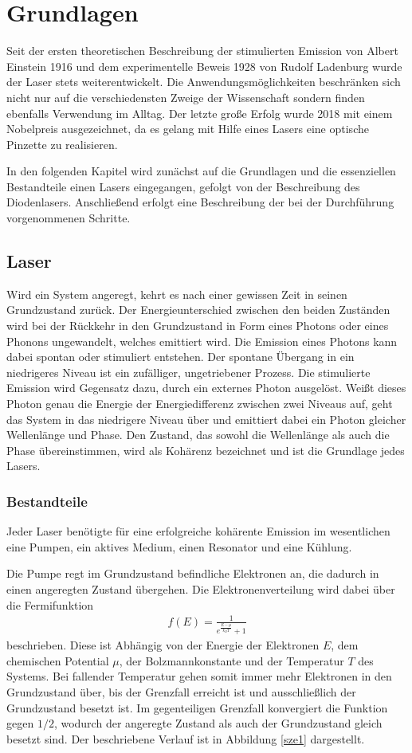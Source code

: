 \section{Grundlagen}
\label{sec:Grundlagen}
Seit der ersten theoretischen Beschreibung der stimulierten Emission von Albert Einstein 1916 und dem experimentelle Beweis 1928 von Rudolf Ladenburg wurde der Laser stets weiterentwickelt. Die Anwendungsmöglichkeiten beschränken sich nicht nur auf die verschiedensten Zweige der Wissenschaft sondern finden ebenfalls Verwendung im Alltag. Der letzte große Erfolg wurde 2018 mit einem Nobelpreis ausgezeichnet, da es gelang mit Hilfe eines Lasers eine optische Pinzette zu realisieren.

In den folgenden Kapitel wird zunächst auf die Grundlagen und die essenziellen Bestandteile einen Lasers eingegangen, gefolgt von der Beschreibung des Diodenlasers. Anschließend erfolgt eine Beschreibung der bei der Durchführung vorgenommenen Schritte.

\subsection{Laser}
Wird ein System angeregt, kehrt es nach einer gewissen Zeit in seinen Grundzustand zurück. Der Energieunterschied zwischen den beiden Zuständen wird bei der Rückkehr in den Grundzustand in Form eines Photons oder eines Phonons ungewandelt, welches emittiert wird. Die Emission eines Photons kann dabei spontan oder stimuliert entstehen. Der spontane Übergang in ein niedrigeres Niveau ist ein zufälliger, ungetriebener Prozess. Die stimulierte Emission wird Gegensatz dazu, durch ein externes Photon ausgelöst. Weißt dieses Photon genau die Energie der Energiedifferenz zwischen zwei Niveaus auf, geht das System in das niedrigere Niveau über und emittiert dabei ein Photon gleicher Wellenlänge und Phase. Den Zustand, das sowohl die Wellenlänge als auch die Phase übereinstimmen, wird als Kohärenz bezeichnet und ist die Grundlage jedes Lasers.

\subsubsection{Bestandteile}
\label{sec:Bestandteile}
Jeder Laser benötigte für eine erfolgreiche kohärente Emission im wesentlichen eine Pumpen, ein aktives Medium, einen Resonator und eine Kühlung.

Die Pumpe regt im Grundzustand befindliche Elektronen an, die dadurch in einen angeregten Zustand übergehen. Die Elektronenverteilung wird dabei über die Fermifunktion
\begin{align}
	f(E)=\frac{1}{e^{\frac{E-\mu}{k_B T}}+1}
\end{align}
beschrieben. Diese ist Abhängig von der Energie der Elektronen $E$, dem chemischen Potential $\mu$, der Bolzmannkonstante und der Temperatur $T$ des Systems. Bei fallender Temperatur gehen somit immer mehr Elektronen in den Grundzustand über, bis der Grenzfall erreicht ist und ausschließlich der Grundzustand besetzt ist. Im gegenteiligen Grenzfall konvergiert die Funktion gegen $1/2$, wodurch der angeregte Zustand als auch der Grundzustand gleich besetzt sind. Der beschriebene Verlauf ist in Abbildung \ref{sze1} dargestellt.

